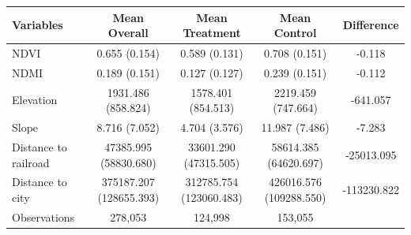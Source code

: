 
\begin{tabular}{lcccc}
\toprule
Variables & Mean Overall & Mean Treatment & Mean Control & Difference\\
\midrule
NDVI & 0.655 (0.154) & 0.589 (0.131) & 0.708 (0.151) & -0.118\\
NDMI & 0.189 (0.151) & 0.127 (0.127) & 0.239 (0.151) & -0.112\\
Elevation & 1931.486 (858.824) & 1578.401 (854.513) & 2219.459 (747.664) & -641.057\\
Slope & 8.716 (7.052) & 4.704 (3.576) & 11.987 (7.486) & -7.283\\
Distance to railroad & 47385.995 (58830.680) & 33601.290 (47315.505) & 58614.385 (64620.697) & -25013.095\\
Distance to city & 375187.207 (128655.393) & 312785.754 (123060.483) & 426016.576 (109288.550) & -113230.822\\
Observations & 278,053 & 124,998 & 153,055 & \\
\bottomrule
\end{tabular}